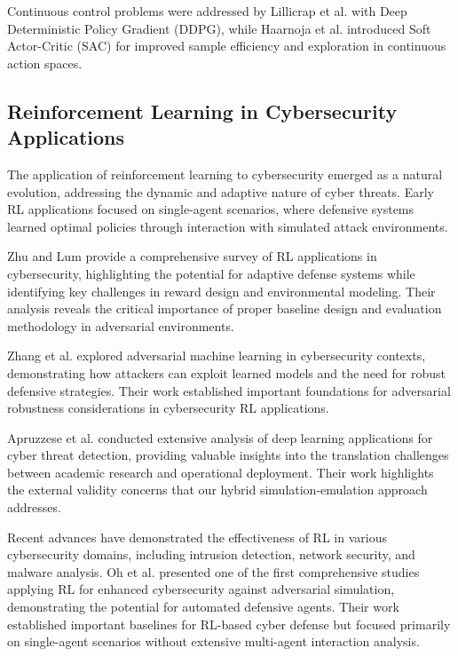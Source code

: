 \documentclass[12pt,oneside]{article}
\begin{document}
Continuous control problems were addressed by Lillicrap et al. \cite{lillicrap2015continuous} with Deep Deterministic Policy Gradient (DDPG), while Haarnoja et al. \cite{haarnoja2018soft} introduced Soft Actor-Critic (SAC) for improved sample efficiency and exploration in continuous action spaces.

\subsection{Reinforcement Learning in Cybersecurity Applications}

The application of reinforcement learning to cybersecurity emerged as a natural evolution, addressing the dynamic and adaptive nature of cyber threats. Early RL applications focused on single-agent scenarios, where defensive systems learned optimal policies through interaction with simulated attack environments.

Zhu and Lum \cite{zhu2021survey} provide a comprehensive survey of RL applications in cybersecurity, highlighting the potential for adaptive defense systems while identifying key challenges in reward design and environmental modeling. Their analysis reveals the critical importance of proper baseline design and evaluation methodology in adversarial environments.

Zhang et al. \cite{zhang2020adversarial} explored adversarial machine learning in cybersecurity contexts, demonstrating how attackers can exploit learned models and the need for robust defensive strategies. Their work established important foundations for adversarial robustness considerations in cybersecurity RL applications.

Apruzzese et al. \cite{apruzzese2022deep} conducted extensive analysis of deep learning applications for cyber threat detection, providing valuable insights into the translation challenges between academic research and operational deployment. Their work highlights the external validity concerns that our hybrid simulation-emulation approach addresses.

Recent advances have demonstrated the effectiveness of RL in various cybersecurity domains, including intrusion detection, network security, and malware analysis. Oh et al. \cite{oh2023applying} presented one of the first comprehensive studies applying RL for enhanced cybersecurity against adversarial simulation, demonstrating the potential for automated defensive agents. Their work established important baselines for RL-based cyber defense but focused primarily on single-agent scenarios without extensive multi-agent interaction analysis.
\end{document}
